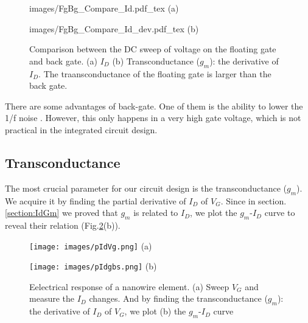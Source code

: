 \begin{figure}[!htbp]
    \centering
    \begin{minipage}[t][0.1\textheight]{0.4\textheight}
        \centering
        \def\svgwidth{12cm}
        \fontsize{6}{15}\selectfont
         {images/FgBg_Compare_Id.pdf_tex}
        (a)
    \end{minipage}
    \vfill
    \begin{minipage}[t][0.1\textheight]{0.4\textheight}
        \centering
        \def\svgwidth{12cm}
        \fontsize{6}{15}\selectfont
         {images/FgBg_Compare_Id_dev.pdf_tex}
        (b)
    \end{minipage}
    \caption{Comparison between the DC sweep of voltage on the floating gate and back gate. (a) $I_D$ (b) Transconductance ($g_m$): the derivative of $I_D$. The traansconductance of the floating gate is larger than the back gate.}
    \label{fig:IdVgandgbsId}
\end{figure}


There are some advantages of back-gate.
One of them is the ability to lower the 1/f noise \cite{C7, C8}.
However, this only happens in a very high gate voltage, which is not practical in the integrated circuit design.

\subsection{Transconductance}
The most crucial parameter for our circuit design is the transconductance ($g_m$).
We acquire it by finding the partial derivative of $I_D$ of $V_{G}$.
Since in section.\ref{section:IdGm} we proved that $g_m$ is related to $I_D$, we plot the $g_m$-$I_D$ curve to reveal their relation (Fig.\ref{fig:pIdVg}(b)).

\begin{figure}[!htbp]
    \centering
    \begin{minipage}[t][0.1\textheight]{1\textwidth}
        \centering
        \texttt{[image: images/pIdVg.png]}
        (a)
    \end{minipage}
    \hfill
    \begin{minipage}[t][0.1\textheight]{1\textwidth}
        \centering
        \texttt{[image: images/pIdgbs.png]}
        (b)
    \end{minipage}
    \caption{Eelectrical response of a nanowire element. (a) Sweep $V_G$ and measure the $I_D$ changes. And by finding the transconductance ($g_m$): the derivative of $I_D$ of $V_G$, we plot (b) the $g_m$-$I_D$ curve}
    \label{fig:pIdVg}
\end{figure}

